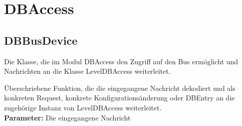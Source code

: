 \documentclass[entwurf.tex]{subfiles}
\begin{document}
		
	\section{DBAccess}
	\subsection{DBBusDevice}
	\label{Class:DBBusDevice}
	Die Klasse, die im Modul DBAccess den Zugriff auf den Bus ermöglicht und Nachrichten an die Klasse LevelDBAccess weiterleitet. \\
	\begin{description}
	Überschriebene Funktion, die die eingegangene Nachricht dekodiert und als konkreten Request, konkrete Konfigurationsänderung oder DBEntry an die zugehörige Instanz von LevelDBAccess weiterleitet. \\
	\textbf{Parameter:} Die eingegangene Nachricht
	\end{description}
	
\end{document}
